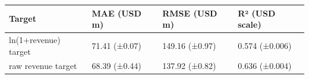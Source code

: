 \begin{tabular}{llll}
\toprule
Target & MAE (USD m) & RMSE (USD m) & R² (USD scale) \\
\midrule
ln(1+revenue) target & 71.41 (±0.07) & 149.16 (±0.97) & 0.574 (±0.006) \\
raw revenue target & 68.39 (±0.44) & 137.92 (±0.82) & 0.636 (±0.004) \\
\bottomrule
\end{tabular}
